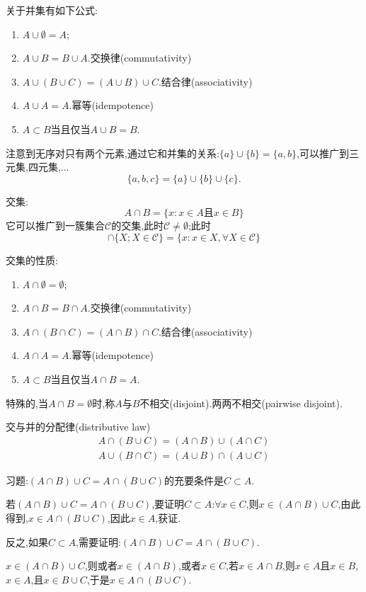 \documentclass[12pt,a4paper,openany]{book}
\begin{document}
关于并集有如下公式:
\begin{enumerate}
\item $A \cup \emptyset = A$;
\item $A \cup B = B \cup A$.交换律(commutativity)
\item $A \cup (B \cup C) = (A \cup B) \cup C$.结合律(associativity)
\item $A \cup A = A$.幂等(idempotence)
\item $A \subset B$当且仅当$A \cup B = B$.
\end{enumerate}

注意到无序对只有两个元素,通过它和并集的关系:$\{a\} \cup \{b\} = \{a,b\}$,可以推广到三元集,四元集,...
\[
\{a,b,c\}=\{a\}\cup\{b\}\cup\{c\}.
\]

交集:
\[
A \cap B = \{x : x \in A \text{且} x \in B\}
\]
它可以推广到一簇集合$\mathscr{C}$的交集,此时$\mathscr{C} \neq \emptyset$;此时
\[
\cap\{X; X \in \mathscr{C}\} = \{x: x \in X, \forall X \in \mathscr{C}\}
\]

交集的性质:
\begin{enumerate}
\item $A \cap \emptyset = \emptyset$;
\item $A \cap B = B \cap A$.交换律(commutativity)
\item $A \cap (B \cap C) = (A \cap B) \cap C$.结合律(associativity)
\item $A \cap A = A$.幂等(idempotence)
\item $A \subset B$当且仅当$A \cap B = A$.
\end{enumerate}

特殊的,当$A \cap B = \emptyset$时,称$A$与$B$不相交(disjoint).两两不相交(pairwise disjoint).

交与并的分配律(distributive law)
\begin{gather*}
A \cap (B \cup C) = (A \cap B) \cup (A \cap C)\\
A \cup (B \cap C) = (A \cup B) \cap (A \cup C)
\end{gather*}

习题:$(A \cap B) \cup C = A \cap (B \cup C)$的充要条件是$C \subset A$.

若$(A \cap B) \cup C = A \cap (B \cup C)$,要证明$C \subset A$:$\forall x \in C$,则$x \in (A \cap B) \cup C$,由此得到,$x \in A \cap (B \cup C)$,因此$x \in A$,获证.

反之,如果$C \subset A$,需要证明:$(A \cap B) \cup C = A \cap (B \cup C)$.

$x \in (A \cap B) \cup C$,则或者$x \in (A \cap B)$,或者$x \in C$,若$x \in A \cap B$,则$x \in A$且$x \in B$,$x \in A$,且$x \in B \cup C$,于是$x \in A \cap (B \cup C)$.
\end{document}
